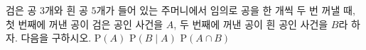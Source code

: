 검은 공 $3$개와 흰 공 $5$개가 들어 있는 주머니에서 임의로 공을 한 개씩 두 번 꺼낼 때, 첫 번째에 꺼낸 공이 검은 공인 사건을 $A$, 두 번째에 꺼낸 공이 흰 공인 사건을 $B$라 하자. 다음을 구하시오. 
 $\mathrm{P}(A)$
 $\mathrm{P}(B\mid A)$
 $\mathrm{P}(A\cap B)$
